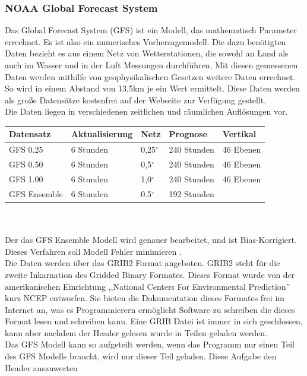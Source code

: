 \subsubsection*{NOAA Global Forecast System} %
Das Global Forecast System (GFS) ist ein Modell, das mathematisch Parameter errechnet.
Es ist also ein numerisches Vorhersagemodell.
Die dazu benötigten Daten bezieht es aus einem Netz von Wetterstationen,
die sowohl an Land als auch im Wasser und in der Luft Messungen durchführen.
Mit diesen gemessenen Daten werden mithilfe von geophysikalischen Gesetzen weitere Daten errechnet.
So wird in einem Abstand von 13,5km je ein Wert ermittelt.
Diese Daten werden als große Datensätze kostenfrei auf
der Webseite  \cite{ncep} zur Verfügung gestellt.\\
Die Daten liegen in verschiedenen zeitlichen und räumlichen Auflösungen vor.
\newpage
\begin{tabular}{|l|l|l|l|l|}
	\hline
	Datensatz & Aktualisierung & Netz & Prognose & Vertikal\\
	\hline
	GFS 0.25 & 6 Stunden & 0,25$^{\circ}$ & 240 Stunden & 46 Ebenen\\
	\hline
	GFS 0.50 & 6 Stunden & 0,5$^{\circ}$ & 240 Stunden & 46 Ebenen\\
	\hline
	GFS 1.00 & 6 Stunden & 1,0$^{\circ}$ & 240 Stunden & 46 Ebenen\\
	\hline
	GFS Ensemble & 6 Stunden & 0.5$^{\circ}$ & 192 Stunden & \\
	\hline
\end{tabular}
\\
\\
Der das GFS Ensemble Modell wird genauer bearbeitet, und ist Bias-Korrigiert.
Dieses Verfahren soll Modell Fehler minimieren \cite{gfshdens}. \\
Die Daten werden über das GRIB2 Format angeboten. GRIB2 steht für die zweite Inkarnation
des Gridded Binary Formates. Dieses Format wurde
von der amerikanischen Einrichtung ,,National Centers For Environmental Prediction''
kurz NCEP entworfen. Sie bieten die Dokumentation dieses Formates frei im Internet
an, was es Programmierern ermöglicht Software zu schreiben die dieses Format lesen und
schreiben kann. Eine GRIB Datei ist immer in sich geschlossen, kann aber nachdem der
Header gelesen wurde in Teilen geladen werden.\\
Das GFS Modell kann so aufgeteilt werden, wenn das Programm nur einen Teil des GFS
Modells braucht, wird nur dieser Teil geladen. Diese Aufgabe den Header auszuwerten
